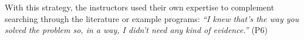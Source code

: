 
With this strategy, the instructors used their own expertise to complement searching through the literature or example programs: \textit{``I knew that's the way you solved the problem so, in a way, I didn't need any kind of evidence.''} (P6)






